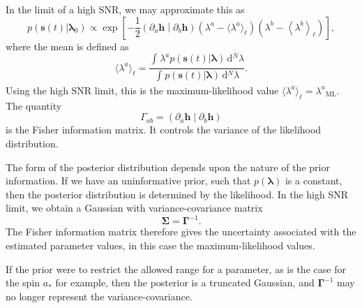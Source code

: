 \documentclass[useAMS,usedcolumn,usegraphicx,usenatbib]{mn2e}
\newcommand{\sub}[1]{\ensuremath{_\mathrm{#1}}}
\newcommand{\dd}{\ensuremath{\mathrm{d}}}
\newcommand{\intd}[4]{\ensuremath{\int_{#1}^{#2}{#3}\,\dd{#4}}}
\newcommand{\recip}[1]{\ensuremath{\frac{1}{#1}}}
\newcommand{\innerprod}[2]{\ensuremath{\left({#1}\middle|{#2}\right)}}
\begin{document}
In the limit of a high SNR, we may approximate this as \citep{Vallisneri2008}
\begin{equation}
p(\boldsymbol{s}(t)|\boldsymbol{\lambda}_0) \propto \exp\left[-\recip{2}\innerprod{\partial_a\boldsymbol{h}}{\partial_b\boldsymbol{h}}\left(\lambda^a - \langle\lambda^a\rangle_\ell\right)\left(\lambda^b - \left\langle\lambda^b\right\rangle_\ell\right)\right],
\label{eq:LSA}
\end{equation}
where the mean is defined as
\begin{equation}
\langle\lambda^a\rangle_\ell = \frac{\intd{}{}{\lambda^a p(\boldsymbol{s}(t)|\boldsymbol{\lambda})}{^N \lambda}}{\intd{}{}{p(\boldsymbol{s}(t)|\boldsymbol{\lambda})}{^N \lambda}}.
\end{equation}
Using the high SNR limit, this is the maximum-likelihood value $\langle\lambda^a\rangle_\ell = \lambda^a\sub{ML}$. The quantity
\begin{equation}
\Gamma_{ab} = \innerprod{\partial_a\boldsymbol{h}}{\partial_b\boldsymbol{h}}
\label{eq:Fisher}
\end{equation}
is the Fisher information matrix. It controls the variance of the likelihood distribution.

The form of the posterior distribution depends upon the nature of the prior information. If we have an uninformative prior, such that $p(\boldsymbol{\lambda})$ is a constant, then the posterior distribution is determined by the likelihood. In the high SNR limit, we obtain a Gaussian with variance-covariance matrix
\begin{equation}
\boldsymbol{\Sigma} = \boldsymbol{\Gamma}^{-1}.
\label{eq:InvFisher}
\end{equation}
The Fisher information matrix therefore gives the uncertainty associated with the estimated parameter values, in this case the maximum-likelihood values.

If the prior were to restrict the allowed range for a parameter, as is the case for the spin $a_\ast$ for example, then the posterior is a truncated Gaussian, and $\boldsymbol{\Gamma}^{-1}$ may no longer represent the variance-covariance.
\end{document}
